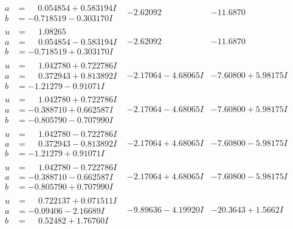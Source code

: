 \documentclass[1p]{elsarticle_modified}
\theoremstyle{definition}
\begin{document}
$$\begin{array}{c|c|c}
\begin{aligned}
a &= \phantom{-}0.054854 + 0.583194 I \\
b &= -0.718519 - 0.303170 I\end{aligned}
 & -2.62092\phantom{ +0.000000I} & -11.6870\phantom{ +0.000000I} \\ \hline\begin{aligned}
u &= \phantom{-}1.08265\phantom{ +0.000000I} \\
a &= \phantom{-}0.054854 - 0.583194 I \\
b &= -0.718519 + 0.303170 I\end{aligned}
 & -2.62092\phantom{ +0.000000I} & -11.6870\phantom{ +0.000000I} \\ \hline\begin{aligned}
u &= \phantom{-}1.042780 + 0.722786 I \\
a &= \phantom{-}0.372943 + 0.813892 I \\
b &= -1.21279 - 0.91071 I\end{aligned}
 & -2.17064 - 4.68065 I & -7.60800 + 5.98175 I \\ \hline\begin{aligned}
u &= \phantom{-}1.042780 + 0.722786 I \\
a &= -0.388710 + 0.662587 I \\
b &= -0.805790 - 0.707990 I\end{aligned}
 & -2.17064 - 4.68065 I & -7.60800 + 5.98175 I \\ \hline\begin{aligned}
u &= \phantom{-}1.042780 - 0.722786 I \\
a &= \phantom{-}0.372943 - 0.813892 I \\
b &= -1.21279 + 0.91071 I\end{aligned}
 & -2.17064 + 4.68065 I & -7.60800 - 5.98175 I \\ \hline\begin{aligned}
u &= \phantom{-}1.042780 - 0.722786 I \\
a &= -0.388710 - 0.662587 I \\
b &= -0.805790 + 0.707990 I\end{aligned}
 & -2.17064 + 4.68065 I & -7.60800 - 5.98175 I \\ \hline\begin{aligned}
u &= \phantom{-}0.722137 + 0.071511 I \\
a &= -0.09406 - 2.16689 I \\
b &= \phantom{-}0.52482 + 1.76760 I\end{aligned}
 & -9.89636 - 4.19920 I & -20.3643 + 1.5662 I \\ \hline\begin{aligned}

\end{aligned}
\end{array}$$
\end{document}
